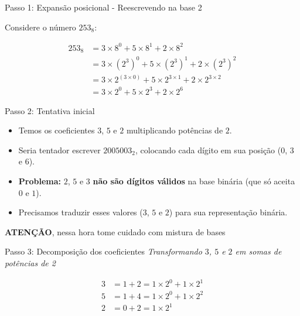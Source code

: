 \begin{frame}{Passo 1: Expansão posicional - Reescrevendo na base 2}


    Considere o número $253_8$:

    \begin{align*}
        253_8 & = 3 \times 8^0 + 5 \times 8^1 + 2 \times 8^2                                    \\
              & = 3 \times (2^3)^0 + 5 \times (2^3)^1 + 2 \times (2^3)^2                        \\
              & = 3 \times 2^{(3 \times 0)} + 5 \times 2^{3 \times 1} + 2 \times 2^{3 \times 2} \\
              & = 3 \times 2^0 + 5 \times 2^{3} + 2 \times 2^{6}
    \end{align*}

\end{frame}

\begin{frame}{Passo 2: Tentativa inicial}


    \begin{itemize}
        \item Temos os coeficientes $3$, $5$ e $2$ multiplicando potências de $2$.
        \item Seria tentador escrever $2005003_2$, colocando cada dígito em sua posição (0, 3 e 6).

        \item \textbf{Problema:} $2$, $5$ e $3$ \textbf{não são dígitos válidos} na base binária (que só aceita $0$ e $1$).
        \item Precisamos traduzir esses valores ($3$, $5$ e $2$) para sua representação binária.
    \end{itemize}


    \textbf{ATENÇÃO}, nessa hora tome cuidado com mistura de bases

\end{frame}

\begin{frame}{Passo 3: Decomposição dos coeficientes}
    \emph{Transformando $3$, $5$ e $2$ em somas de potências de 2}

    \begin{align*}
        3 & = 1 + 2 =  1 \times 2^0 + 1 \times 2^1 \\
        5 & = 1 + 4 =  1 \times 2^0 + 1 \times 2^2 \\
        2 & = 0 + 2 =  1 \times 2^1
    \end{align*}

\end{frame}


